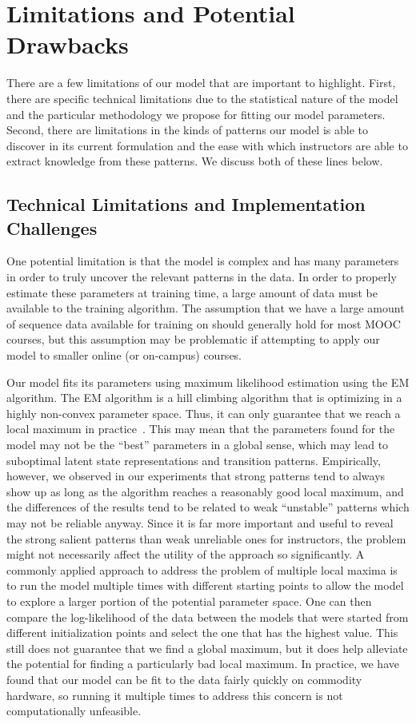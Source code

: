 \section{Limitations and Potential Drawbacks}

There are a few limitations of our model that are important to highlight.
First, there are specific technical limitations due to the statistical
nature of the model and the particular methodology we propose for fitting
our model parameters. Second, there are limitations in the kinds of
patterns our model is able to discover in its current formulation and the
ease with which instructors are able to extract knowledge from these
patterns. We discuss both of these lines below.

\subsection{Technical Limitations and Implementation Challenges}

One potential limitation is that the model is complex and has many parameters
in order to truly uncover the relevant patterns in the data. In order to
properly estimate these parameters at training time, a large amount of data
must be available to the training algorithm. The assumption that we have a
large amount of sequence data available for training on should generally
hold for most MOOC courses, but this assumption may be problematic if
attempting to apply our model to smaller online (or on-campus) courses.

Our model fits its parameters using maximum likelihood estimation using the
EM algorithm. The EM algorithm is a hill climbing algorithm that is
optimizing in a highly non-convex parameter space. Thus, it can only
guarantee that we reach a local maximum in
practice~\citep{Dempster:1977:JRSS}.  This may mean that the parameters
found for the model may not be the ``best'' parameters in a global sense,
which may lead to suboptimal latent state representations and transition
patterns. Empirically, however, we observed in our experiments that strong
patterns tend to always show up as long as the algorithm reaches a
reasonably good local maximum, and the differences of the results tend to
be related to weak ``unstable'' patterns which may not be reliable anyway.
Since it is far more important and useful to reveal the strong salient
patterns than weak unreliable ones for instructors, the problem might not
necessarily affect the utility of the approach so significantly.  A
commonly applied approach to address the problem of multiple local maxima
is to run the model multiple times with different starting points to allow
the model to explore a larger portion of the potential parameter space. One
can then compare the log-likelihood of the data between the models that
were started from different initialization points and select the one that
has the highest value. This still does not guarantee that we find a global
maximum, but it does help alleviate the potential for finding a
particularly bad local maximum.  In practice, we have found that our model
can be fit to the data fairly quickly on commodity hardware, so running it
multiple times to address this concern is not computationally unfeasible.


